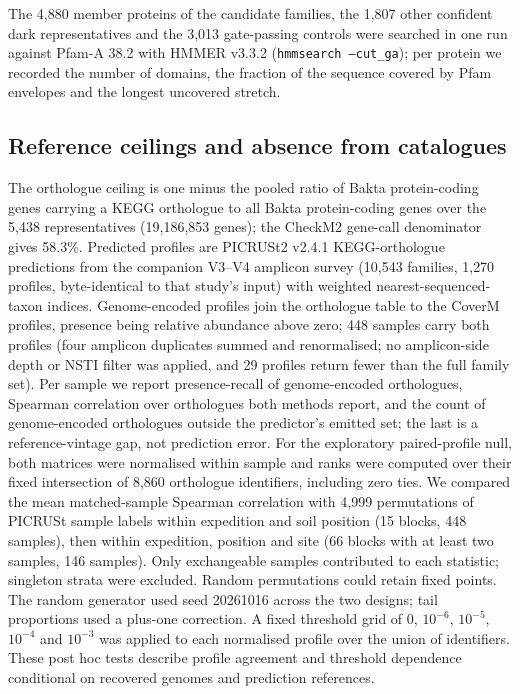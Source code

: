 \documentclass[11pt]{article}
\begin{document}
The 4{,}880 member proteins of
the candidate families, the 1{,}807 other confident dark representatives and the 3{,}013 gate-passing
controls were searched in one run against Pfam-A 38.2 with HMMER v3.3.2 (\texttt{hmmsearch --cut\_ga});
per protein we recorded the number of domains, the fraction of the sequence covered by Pfam
envelopes and the longest uncovered stretch.

\subsection*{Reference ceilings and absence from catalogues}
The orthologue ceiling is one minus the pooled ratio of Bakta protein-coding genes carrying a KEGG
orthologue to all Bakta protein-coding genes over the 5{,}438 representatives (19{,}186{,}853 genes);
the CheckM2 gene-call denominator gives 58.3\%. Predicted profiles are PICRUSt2 v2.4.1
\citep{douglas2020picrust2} KEGG-orthologue predictions from the companion V3--V4 amplicon survey
(10{,}543 families, 1{,}270 profiles, byte-identical to that study's input) with weighted
nearest-sequenced-taxon indices. Genome-encoded profiles join the orthologue table to the CoverM
profiles, presence being relative abundance above zero; 448 samples carry both profiles (four
amplicon duplicates summed and renormalised; no amplicon-side depth or NSTI filter was applied, and
29 profiles return fewer than the full family set). Per sample we report presence-recall of
genome-encoded orthologues, Spearman correlation over orthologues both methods report, and the count
of genome-encoded orthologues outside the predictor's emitted set; the last is a reference-vintage
gap, not prediction error.
For the exploratory paired-profile null, both matrices were normalised within sample and ranks were computed over their fixed intersection of 8{,}860 orthologue identifiers, including zero ties. We compared the mean matched-sample Spearman correlation with 4{,}999 permutations of PICRUSt sample labels within expedition and soil position (15 blocks, 448 samples), then within expedition, position and site (66 blocks with at least two samples, 146 samples). Only exchangeable samples contributed to each statistic; singleton strata were excluded. Random permutations could retain fixed points. The random generator used seed 20261016 across the two designs; tail proportions used a plus-one correction. A fixed threshold grid of $0$, $10^{-6}$, $10^{-5}$, $10^{-4}$ and $10^{-3}$ was applied to each normalised profile over the union of identifiers. These post hoc tests describe profile agreement and threshold dependence conditional on recovered genomes and prediction references.
\end{document}
